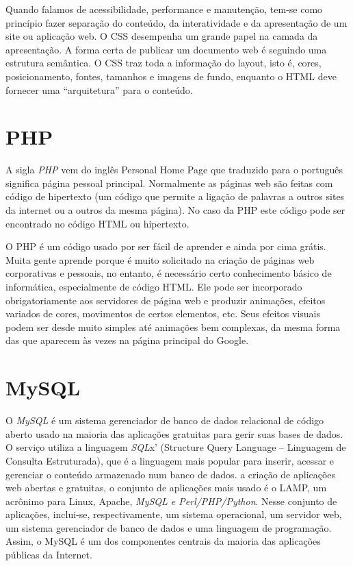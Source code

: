 Quando falamos de acessibilidade, performance e manutenção, tem-se como princípio fazer separação do conteúdo, da interatividade e da apresentação de um site ou aplicação web. O CSS desempenha um grande papel na camada da apresentação.
A forma certa de publicar um documento web é seguindo uma estrutura semântica. O CSS traz toda a informação do layout, isto é, cores, posicionamento, fontes, tamanhos e imagens de fundo, enquanto o HTML deve fornecer uma “arquitetura” para o conteúdo. \cite{css2}

\section{PHP}

A sigla  \textit{PHP} vem do inglês Personal Home Page que traduzido para o português significa página pessoal principal. Normalmente as páginas web são feitas com código de hipertexto (um código que permite a ligação de palavras a outros sites da internet ou a outros da mesma página). No caso da PHP este código pode ser encontrado no código HTML ou hipertexto.

O PHP é um código usado por ser fácil de aprender e ainda por cima grátis. Muita gente aprende porque é muito solicitado na criação de páginas web corporativas e pessoais, no entanto, é necessário certo conhecimento básico de informática, especialmente de código HTML. Ele pode ser incorporado obrigatoriamente aos servidores de página web e produzir animações, efeitos variados de cores, movimentos de certos elementos, etc. Seus efeitos visuais podem ser desde muito simples até animações bem complexas, da mesma forma das que aparecem às vezes na página principal do Google. \cite{php}

\section{MySQL}

O  \textit{MySQL} é um sistema gerenciador de banco de dados relacional de código aberto usado na maioria das aplicações gratuitas para gerir suas bases de dados. O serviço utiliza a linguagem  \textit{SQL}x' (Structure Query Language – Linguagem de Consulta Estruturada), que é a linguagem mais popular para inserir, acessar e gerenciar o conteúdo armazenado num banco de dados.
a criação de aplicações web abertas e gratuitas, o conjunto de aplicações mais usado é o LAMP, um acrônimo para Linux, Apache, \textit{MySQL e Perl/PHP/Python}. Nesse conjunto de aplicações, inclui-se, respectivamente, um sistema operacional, um servidor web, um sistema gerenciador de banco de dados e uma linguagem de programação. Assim, o MySQL é um dos componentes centrais da maioria das aplicações públicas da Internet. \cite{mysql}


